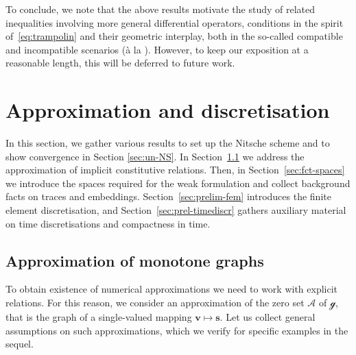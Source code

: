\documentclass[reqno,a4paper]{amsart}
\def\vec#1{\boldsymbol{#1}}
\def\bs{\vec{s}}
\def\bv{\vec{v}}
\def\gbd{\vec{\mathcal{g}}}
\begin{document}
	To conclude, we note that the above results motivate the study of related inequalities involving more general differential operators, conditions in the spirit of~\eqref{eq:trampolin} and their geometric interplay, both in the so-called compatible and incompatible scenarios (\`{a} la \cite{GmeinederLewintanNeff2022,GmeinederLewintanNeff2023,GmeinederSpector}). 
	However, to keep our exposition at a reasonable length, this will be deferred to future work. 
	
	
	\section{Approximation and discretisation}
	\label{sec:prel}

	In this section, we gather  various results to set up the Nitsche scheme and to show convergence in Section \ref{sec:un-NS}. 
	In Section~\ref{sec:graphapprox} we address the approximation of implicit constitutive relations. 
	Then, in Section~\ref{sec:fct-spaces} we introduce the spaces required for the weak formulation and collect background facts on traces and embeddings.
	Section~\ref{sec:prelim-fem} introduces the finite element discretisation, and
	Section~\ref{sec:prel-timediscr} gathers auxiliary material on time discretisations and compactness in time. 
	
	\subsection{Approximation of monotone graphs}\label{sec:graphapprox}
	To obtain existence of numerical approximations we need to work with explicit relations. 
	For this reason, we consider an approximation of the zero set $\mathcal{A}$ of $\gbd$, that is the graph of a single-valued mapping $\bv \mapsto \bs$. 
	Let us collect general assumptions on such approximations, which we verify for specific examples in the sequel. 
	
\end{document}

